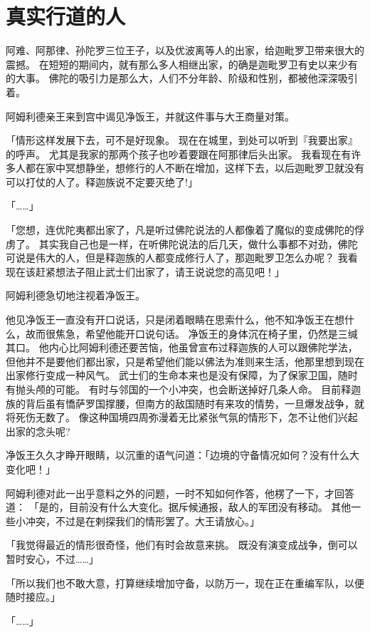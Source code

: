 \documentclass[twoside,openany]{book}
\begin{document}
\section{真实行道的人}\label{sec9.5}

阿难、阿那律、孙陀罗三位王子，以及优波离等人的出家，给迦毗罗卫带来很大的震撼。
在短短的期间内，就有那么多人相继出家，的确是迦毗罗卫有史以来少有的大事。
佛陀的吸引力是那么大，人们不分年龄、阶级和性别，都被他深深吸引着。

阿姆利德亲王来到宫中谒见净饭王，并就这件事与大王商量对策。

「情形这样发展下去，可不是好现象。
现在在城里，到处可以听到『我要出家』的呼声。
尤其是我家的那两个孩子也吵着要跟在阿那律后头出家。
我看现在有许多人都在家中冥想静坐，想修行的人不断在增加，这样下去，以后迦毗罗卫就没有可以打仗的人了。释迦族说不定要灭绝了!」

「……」

「您想，连优陀夷都出家了，凡是听过佛陀说法的人都像着了魔似的变成佛陀的俘虏了。
其实我自己也是一样，在听佛陀说法的后几天，做什么事都不对劲，佛陀可说是伟大的人，但是释迦族的人都变成修行人了，那迦毗罗卫怎么办呢？
我看现在该赶紧想法子阻止武士们出家了，请王说说您的高见吧！」

阿姆利德急切地注视着净饭王。

他见净饭王一直没有开口说话，只是闭着眼睛在思索什么，他不知净饭王在想什么，故而很焦急，希望他能开口说句话。
净饭王的身体沉在椅子里，仍然是三缄其口。
他内心比阿姆利德还要苦恼，他虽曾宣布过释迦族的人可以跟佛陀学法，但他并不是要他们都出家，只是希望他们能以佛法为准则来生活，他那里想到现在出家修行变成一种风气。
武士们的生命本来也是没有保障，为了保家卫国，随时有抛头颅的可能。
有时与邻国的一个小冲突，也会断送掉好几条人命。
目前释迦族的背后虽有憍萨罗国撑腰，但南方的敌国随时有来攻的情势，一旦爆发战争，就将死伤无数了。
像这种国境四周弥漫着无比紧张气氛的情形下，怎不让他们兴起出家的念头呢?

净饭王久久才睁开眼睛，以沉重的语气问道：「边境的守备情况如何？没有什么大变化吧！」

阿姆利德对此一出乎意料之外的问题，一时不知如何作答，他楞了一下，才回答道：
「是的，目前没有什么大变化。据斥候通报，敌人的军团没有移动。
其他一些小冲突，不过是在剌探我们的情形罢了。大王请放心。」

「我觉得最近的情形很奇怪，他们有时会故意来挑。
既没有演变成战争，倒可以暂时安心，不过……」

「所以我们也不敢大意，打算继续增加守备，以防万一，现在正在重编军队，以便随时接应。」

「……」
\end{document}
